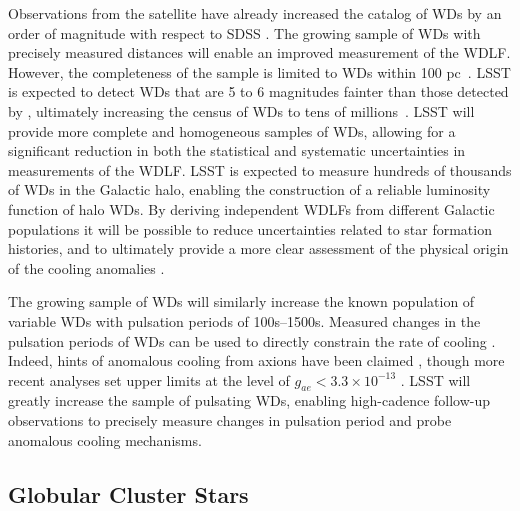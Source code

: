 Observations from the \Gaia satellite have already increased the catalog of WDs by an order of magnitude with respect to SDSS \citep{1805.01227,1807.02559,1807.03315}.
The growing sample of WDs with precisely measured distances will enable an improved measurement of the WDLF.  
However, the completeness of the \Gaia sample is limited to WDs within 100 pc~\citep{1807.03315}.
LSST is expected to detect WDs that are 5 to 6 magnitudes fainter than those detected by \Gaia, ultimately increasing the census of WDs to tens of millions~\citep{0912.0201}.
LSST will provide more complete and homogeneous samples of WDs, allowing for a significant reduction in both the statistical and systematic uncertainties in measurements of the WDLF. 
LSST is expected to measure hundreds of thousands of WDs in the Galactic halo, enabling the construction of a reliable luminosity function of halo WDs. 
By deriving independent WDLFs from different Galactic populations it will be possible to reduce uncertainties related to star formation histories, and to ultimately provide a more clear assessment of the physical origin of the cooling anomalies \citep{Isern:2018uce}. 

The growing sample of WDs will similarly increase the known population of variable WDs with pulsation periods of 100s--1500s. 
Measured changes in the pulsation periods of WDs can be used to directly constrain the rate of cooling \citep[\eg][]{1007.2659}.
Indeed, hints of anomalous cooling from axions have been claimed \citep[\eg][]{Corsico:2012ki,Corsico:2012sh}, though more recent analyses set upper limits at the level of $g_{ae} < 3.3 \times 10^{-13}$ \citep{Battich:2016htm}. 
LSST will greatly increase the sample of pulsating WDs, enabling high-cadence follow-up observations to precisely measure changes in pulsation period and probe anomalous cooling mechanisms.


\subsection{Globular Cluster Stars}


